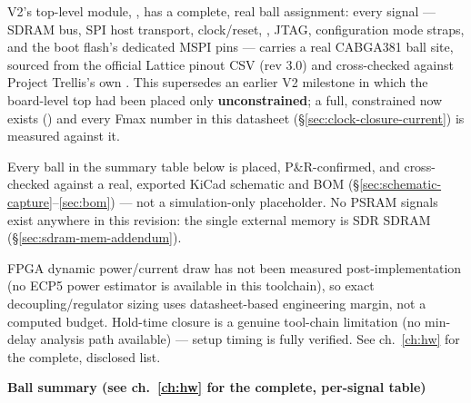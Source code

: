 \thispagestyle{plain}
\noindent
{}

\vspace{6pt}
\noindent
{\footnotesize
V2's top-level module, , has a complete,
real ball assignment: every signal --- SDRAM bus, SPI host transport,
clock/reset, , JTAG, configuration mode straps,
and the boot flash's dedicated MSPI pins --- carries a real CABGA381 ball
site, sourced from the official Lattice pinout CSV (rev 3.0) and
cross-checked against Project Trellis's own . This
supersedes an earlier V2 milestone in which the board-level top had been
placed only \textbf{unconstrained}; a full, constrained  now
exists () and every
Fmax number in this datasheet (\S\ref{sec:clock-closure-current}) is
measured against it.
}

\vspace{6pt}
\begin{fnnote}
Every ball in the summary table below is placed, P\&R-confirmed, and
cross-checked against a real, exported KiCad schematic and BOM
(\S\ref{sec:schematic-capture}--\ref{sec:bom}) --- not a simulation-only
placeholder. No PSRAM signals exist anywhere in this revision: the
single external memory is SDR SDRAM (\S\ref{sec:sdram-mem-addendum}).
\end{fnnote}

\begin{fnwarn}
FPGA dynamic power/current draw has not been measured post-implementation
(no ECP5 power estimator is available in this toolchain), so exact
decoupling/regulator sizing uses datasheet-based engineering margin, not
a computed budget. Hold-time closure is a genuine tool-chain limitation
(no min-delay analysis path available) --- setup timing is fully
verified. See ch.~\ref{ch:hw} for the complete, disclosed list.
\end{fnwarn}

\vspace{6pt}
\noindent
{\small\color{fnDark}\bfseries Ball summary (see ch.~\ref{ch:hw} for the
complete, per-signal table)}
\vspace{2pt}

